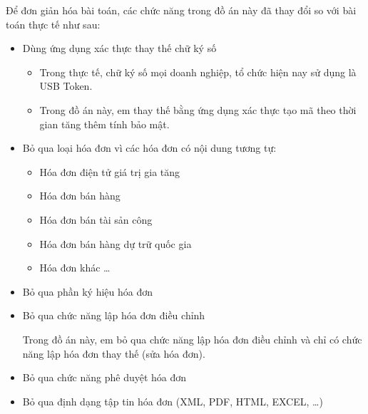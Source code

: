 Để đơn giản hóa bài toán, các chức năng trong đồ án này đã thay đổi so với bài toán thực tế như sau:

\begin{itemize}

\item Dùng ứng dụng xác thực thay thế chữ ký số

\begin{itemize}
    \item    Trong thực tế, chữ ký số mọi doanh nghiệp, tổ chức hiện nay sử dụng là USB Token.

    \item Trong đồ án này, em thay thế bằng ứng dụng xác thực tạo mã theo thời gian tăng thêm tính bảo mật.
\end{itemize}

\item Bỏ qua loại hóa đơn vì các hóa đơn có nội dung tương tự:

\begin{itemize}

\item Hóa đơn điện tử giá trị gia tăng

\item Hóa đơn bán hàng

\item Hóa đơn bán tài sản công

\item Hóa đơn bán hàng dự trữ quốc gia

\item Hóa đơn khác \dots

\end{itemize}

\item Bỏ qua phần ký hiệu hóa đơn


\item Bỏ qua chức năng lập hóa đơn điều chỉnh

Trong đồ án này, em bỏ qua chức năng lập hóa đơn điều chỉnh và chỉ có chức năng lập hóa đơn thay thế (sửa hóa đơn).

\item Bỏ qua chức năng phê duyệt hóa đơn

\item Bỏ qua định dạng tập tin hóa đơn (XML, PDF, HTML, EXCEL, \dots)

\end{itemize}